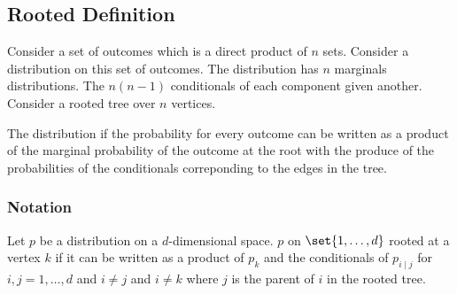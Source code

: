 
\sbasic



































\sstart
{}



\subsection{Rooted Definition}

Consider a set of outcomes which
is a direct product of $n$ sets.
Consider a distribution on this
set of outcomes.
The distribution has
$n$ marginals distributions.
The $n(n-1)$ conditionals
of each component given another.
Consider a rooted tree over $n$ vertices.

The distribution
if the probability for every outcome can
be written as a product
of the marginal probability of the outcome
at the root with the produce of the probabilities
of the conditionals correponding to the edges
in the tree.

\subsubsection{Notation}


Let $p$ be a distribution on
a $d$-dimensional space.
$p$
on $\set{1, \dots, d}$ rooted
at a vertex $k$ if it can be
written as a product of $p_k$
and the conditionals of $p_{i \mid j}$
for $i,j = 1, \dots, d$ and $i \neq j$
and $i \neq k$ where $j$ is the parent
of $i$ in the rooted tree.

